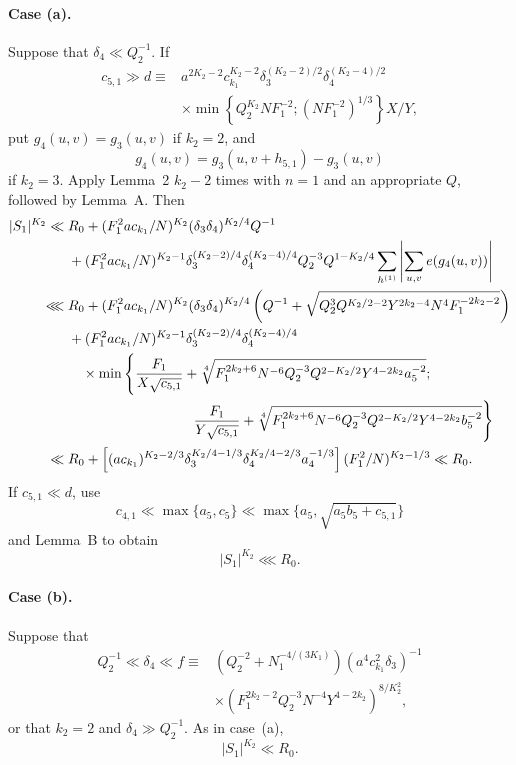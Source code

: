 \documentclass[10pt]{article}
\begin{document}
\paragraph{Case (a).}
Suppose that $\delta_4\ll Q_2^{-1}$. If
\[
\begin{aligned}
  c_{5,1}\gg d\equiv{}&
  a^{2K_2-2}c_{k_1}^{K_2-2}
  \delta_3^{(K_2-2)/2}\delta_4^{(K_2-4)/2}\\
  &\times\min\left\{Q_2^{K_2}NF_1^{-2};(NF_1^{-2})^{1/3}\right\}X/Y,
\end{aligned}
\]
put $g_4(u,v)=g_3(u,v)$ if $k_2=2$, and
\[
  g_4(u,v)=g_3(u,v+h_{5,1})-g_3(u,v)
\]
if $k_2=3$. Apply Lemma~2 $k_2-2$ times with $n=1$ and an appropriate $Q$, followed by Lemma~A. Then
\[
\begin{aligned}
  |S_1|^{K_2}
  \ll{}&R_0+
  (F_1^2ac_{k_1}/N)^{K_2}(\delta_3\delta_4)^{K_2/4}Q^{-1}\\
  &+(F_1^2ac_{k_1}/N)^{K_2-1}
  \delta_3^{(K_2-2)/4}\delta_4^{(K_2-4)/4}
  Q_2^{-3}Q^{1-K_2/4}
  \sum_{h^{(1)}}\left|\sum_{u,v}e(g_4(u,v))\right|\\
  \lll{}&R_0+
  (F_1^2ac_{k_1}/N)^{K_2}(\delta_3\delta_4)^{K_2/4}
  \left(Q^{-1}+\sqrt{Q_2^3Q^{K_2/2-2}Y^{2k_2-4}N^4F_1^{-2k_2-2}}\right)\\
  &+(F_1^2ac_{k_1}/N)^{K_2-1}
  \delta_3^{(K_2-2)/4}\delta_4^{(K_2-4)/4}\\
  &\quad\times\min\Bigg\{
  \frac{F_1}{X\sqrt{c_{5,1}}}
  +\sqrt[4]{F_1^{2k_2+6}N^{-6}Q_2^{-3}Q^{2-K_2/2}Y^{4-2k_2}a_5^{-2}};\\
  &\hspace{32mm}
  \frac{F_1}{Y\sqrt{c_{5,1}}}
  +\sqrt[4]{F_1^{2k_2+6}N^{-6}Q_2^{-3}Q^{2-K_2/2}Y^{4-2k_2}b_5^{-2}}
  \Bigg\}\\
  \ll{}&R_0+
  \left[(ac_{k_1})^{K_2-2/3}
    \delta_3^{K_2/4-1/3}\delta_4^{K_2/4-2/3}a_4^{-1/3}\right]
  (F_1^2/N)^{K_2-1/3}
  \ll R_0.
\end{aligned}
\]
If $c_{5,1}\ll d$, use
\[
  c_{4,1}\ll\max\{a_5,c_5\}
  \ll\max\{a_5,\sqrt{a_5b_5+c_{5,1}}\}
\]
and Lemma~B to obtain
\[
  |S_1|^{K_2}\lll R_0.
\]

\paragraph{Case (b).}
Suppose that
\[
\begin{aligned}
  Q_2^{-1}\ll\delta_4\ll f\equiv{}&
  \left(Q_2^{-2}+N_1^{-4/(3K_1)}\right)
  (a^4c_{k_1}^2\delta_3)^{-1}\\
  &\times\left(F_1^{2k_2-2}Q_2^{-3}N^{-4}Y^{4-2k_2}\right)^{8/K_2^2},
\end{aligned}
\]
or that $k_2=2$ and $\delta_4\gg Q_2^{-1}$. As in case~(a),
\[
  |S_1|^{K_2}\ll R_0.
\]
\end{document}
